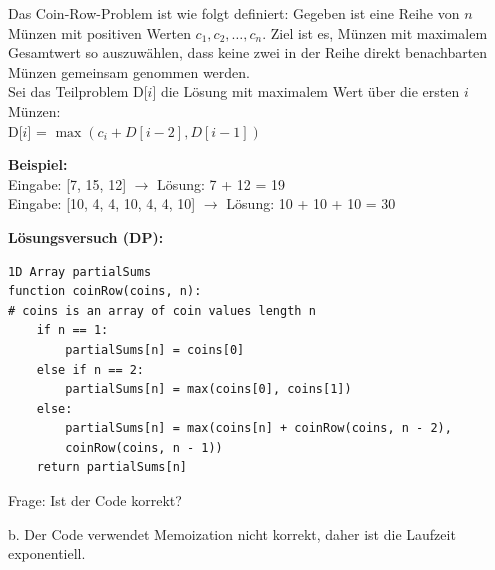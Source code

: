 \begin{contentbox}
Das Coin-Row-Problem ist wie folgt definiert:
Gegeben ist eine Reihe von $n$ Münzen mit positiven Werten $c_1, c_2, \dots, c_n$. Ziel ist es, Münzen mit maximalem Gesamtwert so auszuwählen, dass keine zwei in der Reihe direkt benachbarten Münzen gemeinsam genommen werden. \\
Sei das Teilproblem D[$i$] die Lösung mit maximalem Wert über die ersten $i$ Münzen: \\
D[$i$] = $\max(c_i + D[i-2], D[i-1])$

\textbf{Beispiel:} \\
Eingabe: [7, 15, 12] $\rightarrow$ Lösung: 7 + 12 = 19 \\
Eingabe: [10, 4, 4, 10, 4, 4, 10] $\rightarrow$ Lösung: 10 + 10 + 10 = 30

\textbf{Lösungsversuch (DP):}
\end{contentbox}
\begin{codebox}
\begin{lstlisting}[style=CodeExpert]
1D Array partialSums
function coinRow(coins, n):
# coins is an array of coin values length n
    if n == 1:
        partialSums[n] = coins[0]
    else if n == 2:
        partialSums[n] = max(coins[0], coins[1])
    else:
        partialSums[n] = max(coins[n] + coinRow(coins, n - 2),
        coinRow(coins, n - 1))
    return partialSums[n]
\end{lstlisting}
\end{codebox}
\begin{contentbox}
Frage: Ist der Code korrekt?
\begin{factlist}
    \item b. Der Code verwendet Memoization nicht korrekt, daher ist die Laufzeit exponentiell.
\end{factlist}
\end{contentbox}


